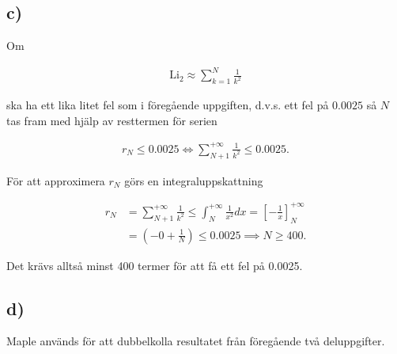 \documentclass[a4paper]{article}
\begin{document}
\subsection*{c)}

Om

\begin{align*}
  \text{Li}_2 \approx \sum_{k=1}^{N}\frac{1}{k^2}
\end{align*}

\noindent ska ha ett lika litet fel som i föregående uppgiften, d.v.s. ett fel på $0.0025$
så $N$ tas fram med hjälp av resttermen för serien

\begin{align*}
  r_N \leq 0.0025 \iff \sum_{N+1}^{+\infty}\frac{1}{k^2} \leq 0.0025.
\end{align*}

\noindent För att approximera $r_N$ görs en integraluppskattning

\begin{align*}
  r_N &= \sum_{N+1}^{+\infty}\frac{1}{k^2} \leq \int_N^{+\infty}\frac{1}{x^2}dx = \left[-\frac{1}{x}\right]_N^{+\infty}\\
  &= \left(-0 + \frac{1}{N}\right) \leq 0.0025 \implies N \geq 400.
\end{align*}

\noindent Det krävs alltså minst 400 termer för att få ett fel på 0.0025.

\subsection*{d)}

Maple används för att dubbelkolla resultatet från föregående två deluppgifter.
\end{document}
